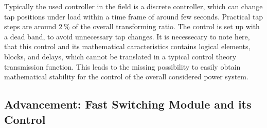 Typically the used controller in the field is a discrete controller, which can change tap positions under load within a time frame of around few seconds. 
Practical tap steps are around $2~\mathrm{\%}$ of the overall transforming ratio. 
The control is set up with a dead band, to avoid unnecessary tap changes. 
It is necessecary to note here, that this control and its mathematical caracteristics contains logical elements, blocks, and delays, which cannot be translated in a typical control theory transmission function. 
This leads to the missing possibility to easily obtain mathematical stability for the control of the overall considered power system. \quelle

\newpage
\subsection{Advancement: Fast Switching Module and its Control}
\label{sec:fsm-description}

